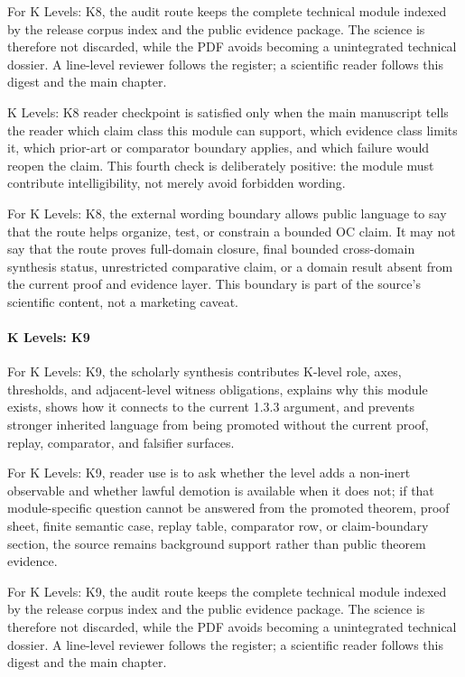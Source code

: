 For K Levels: K8, the audit route keeps the complete technical module indexed by the release corpus index and the public evidence package. The science is therefore not discarded, while the PDF avoids becoming a unintegrated technical dossier. A line-level reviewer follows the register; a scientific reader follows this digest and the main chapter.


K Levels: K8 reader checkpoint is satisfied only when the main manuscript tells the reader which claim class this module can support, which evidence class limits it, which prior-art or comparator boundary applies, and which failure would reopen the claim. This fourth check is deliberately positive: the module must contribute intelligibility, not merely avoid forbidden wording.


For K Levels: K8, the external wording boundary allows public language to say that the route helps organize, test, or constrain a bounded OC claim. It may not say that the route proves full-domain closure, final bounded cross-domain synthesis status, unrestricted comparative claim, or a domain result absent from the current proof and evidence layer. This boundary is part of the source's scientific content, not a marketing caveat.


\paragraph{K Levels: K9}

For K Levels: K9, the scholarly synthesis contributes K-level role, axes, thresholds, and adjacent-level witness obligations, explains why this module exists, shows how it connects to the current 1.3.3 argument, and prevents stronger inherited language from being promoted without the current proof, replay, comparator, and falsifier surfaces.


For K Levels: K9, reader use is to ask whether the level adds a non-inert observable and whether lawful demotion is available when it does not; if that module-specific question cannot be answered from the promoted theorem, proof sheet, finite semantic case, replay table, comparator row, or claim-boundary section, the source remains background support rather than public theorem evidence.


For K Levels: K9, the audit route keeps the complete technical module indexed by the release corpus index and the public evidence package. The science is therefore not discarded, while the PDF avoids becoming a unintegrated technical dossier. A line-level reviewer follows the register; a scientific reader follows this digest and the main chapter.


